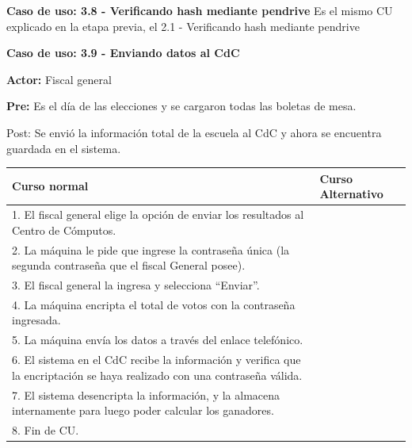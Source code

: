 \textbf{Caso de uso: 3.8 - Verificando hash mediante pendrive}
Es el mismo CU explicado en la etapa previa, el 2.1 - Verificando hash mediante pendrive

\textbf{Caso de uso: 3.9 - Enviando datos al CdC}

\textbf{Actor: }Fiscal general

\textbf{Pre:} Es el día de las elecciones y se cargaron todas las boletas de mesa.

Post: Se envió la información total de la escuela al CdC y ahora se encuentra guardada en el sistema.

\begin{table}[h!]
	
 \begin{tabular}{|p{7.5cm} | p{7.5cm}|} 
 \hline
 \textbf{Curso normal} & \textbf{Curso Alternativo} \\
 \hline

1. El fiscal general elige la opción de enviar los resultados al Centro de Cómputos.  & \\
\hline

2. La máquina le pide que ingrese la contraseña única (la segunda contraseña que el fiscal General posee). & \\
\hline

3. El fiscal general la ingresa y selecciona “Enviar”. & \\
\hline

4. La máquina encripta el total de votos con la contraseña ingresada. & \\
\hline

5. La máquina envía los datos a través del enlace telefónico. & \\
\hline

6. El sistema en el CdC recibe la información y verifica que la encriptación se haya realizado con una contraseña válida. & \\
\hline

7. El sistema desencripta la información, y la almacena internamente para luego poder calcular los ganadores. & \\

\hline

8. Fin de CU. & \\
\hline
\end{tabular}
\end{table}
